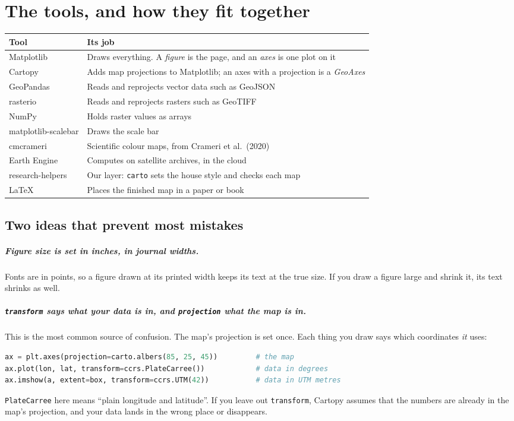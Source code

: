 \chapter{The tools, and how they fit together}\label{ch:stack}

\begin{tabularx}{\linewidth}{@{}lX@{}}
\toprule
Tool & Its job \\
\midrule
Matplotlib & Draws everything. A \emph{figure} is the page, and an \emph{axes} is one plot on it \\
Cartopy & Adds map projections to Matplotlib; an axes with a projection is a \emph{GeoAxes} \\
GeoPandas & Reads and reprojects vector data such as GeoJSON \\
rasterio & Reads and reprojects rasters such as GeoTIFF \\
NumPy & Holds raster values as arrays \\
matplotlib-scalebar & Draws the scale bar \\
cmcrameri & Scientific colour maps, from Crameri et al.\ (2020) \\
Earth Engine & Computes on satellite archives, in the cloud \\
research-helpers & Our layer: \texttt{carto} sets the house style and checks each map \\
LaTeX & Places the finished map in a paper or book \\
\bottomrule
\end{tabularx}

\section{Two ideas that prevent most mistakes}
\paragraph{Figure size is set in inches, in journal widths.} Fonts are in points, so a figure drawn at its printed width keeps its text at the true size. If you draw a figure large and shrink it, its text shrinks as well.


\paragraph{\texttt{transform} says what your data is in, and \texttt{projection} what the map is in.} This is the most common source of confusion. The map's projection is set once. Each thing you draw says which coordinates \emph{it} uses:
\begin{lstlisting}[language=Python]
ax = plt.axes(projection=carto.albers(85, 25, 45))         # the map
ax.plot(lon, lat, transform=ccrs.PlateCarree())            # data in degrees
ax.imshow(a, extent=box, transform=ccrs.UTM(42))           # data in UTM metres
\end{lstlisting}
\texttt{PlateCarree} here means ``plain longitude and latitude''. If you leave out \texttt{transform}, Cartopy assumes that the numbers are already in the map's projection, and your data lands in the wrong place or disappears.

